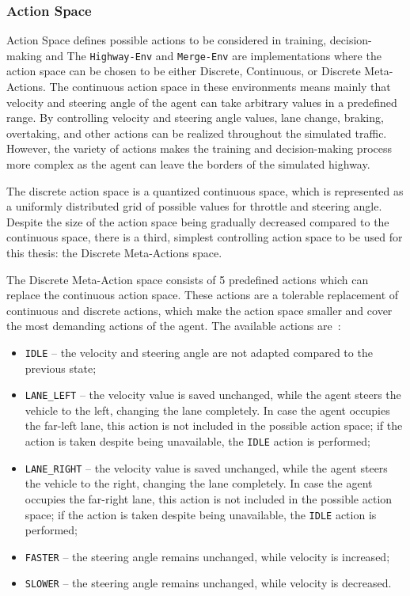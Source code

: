 \subsubsection{Action Space}\label{ssec:subsubsec_3.1.1}

Action Space defines possible actions to be considered in training, decision-making and 
The \texttt{Highway-Env} and \texttt{Merge-Env} are implementations where the action space can be chosen to be either Discrete, Continuous, or Discrete Meta-Actions. The continuous action space in these environments means mainly that velocity and steering angle of the agent can take arbitrary values in a predefined range. By controlling velocity and steering angle values, lane change, braking, overtaking, and other actions can be realized throughout the simulated traffic. However, the variety of actions makes the training and decision-making process more complex as the agent can leave the borders of the simulated highway. 

The discrete action space is a quantized continuous space, which is represented as a uniformly distributed grid of possible values for throttle and steering angle. Despite the size of the action space being gradually decreased compared to the continuous space, there is a third, simplest controlling action space to be used for this thesis: the Discrete Meta-Actions space. 

The Discrete Meta-Action space consists of 5 predefined actions which can replace the continuous action space. These actions are a tolerable replacement of continuous and discrete actions, which make the action space smaller and cover the most demanding actions of the agent. The available actions are~\cite{highwayenv2025}:

\begin{itemize}
    \item \texttt{IDLE} -- the velocity and steering angle are not adapted compared to the previous state;
    \item \texttt{LANE\_LEFT} -- the velocity value is saved unchanged, while the agent steers the vehicle to the left, changing the lane completely. In case the agent occupies the far-left lane, this action is not included in the possible action space; if the action is taken despite being unavailable, the \texttt{IDLE} action is performed;
    \item \texttt{LANE\_RIGHT} -- the velocity value is saved unchanged, while the agent steers the vehicle to the right, changing the lane completely. In case the agent occupies the far-right lane, this action is not included in the possible action space; if the action is taken despite being unavailable, the \texttt{IDLE} action is performed;
    \item \texttt{FASTER} -- the steering angle remains unchanged, while velocity is increased;
    \item \texttt{SLOWER} -- the steering angle remains unchanged, while velocity is decreased.
\end{itemize}

